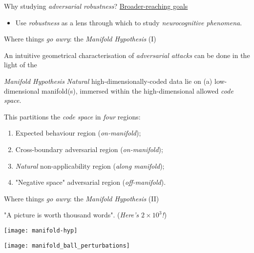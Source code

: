 {\begin{frame}{ Why studying \textit{adversarial robustness}?}
        \underline{Broader-reaching goals}
        \begin{itemize}
            \item Use \textit{robustness} as a lens through which to study \textit{\alert{neurocognitive} phenomena}.
        \end{itemize}
    \end{frame}

    \begin{frame}{ Where things \textit{go awry}: the \textit{Manifold Hypothesis} (I)}

        An intuitive geometrical characterisation of \textit{adversarial attacks} can be done in the light of the

        \begin{block}{\textit{\alert{Manifold} Hypothesis}}
            \textit{Natural} high-dimensionally-coded data lie on (a) \alert{low-dimensional} manifold(s), immersed within the high-dimensional allowed \textit{code space}.
        \end{block}

    This partitions the \textit{code space} in \textit{four} regions:
    \begin{enumerate}
        \item Expected behaviour region (\textit{on-manifold});
        \item Cross-boundary adversarial region (\textit{\alert{on}-manifold});
        \item \textit{Natural} non-applicability region (\textit{\alert{along} manifold});
        \item "Negative space" adversarial region (\textit{\alert{off}-manifold}).
    \end{enumerate}

    \end{frame}

    \begin{frame}{ Where things \textit{go awry}: the \textit{Manifold Hypothesis} (II)}
        \begin{center}
            "A picture is worth thousand words". (\textit{Here's $2\times10^3$!})
        \end{center}

        \begin{minipage}[c]{0.49\textwidth}
            \texttt{[image: manifold-hyp]}
        \end{minipage}
        \begin{minipage}[c]{0.49\textwidth}
            \vspace{0pt}
            \texttt{[image: manifold\_ball\_perturbations]}
        \end{minipage}


\end{frame}}
